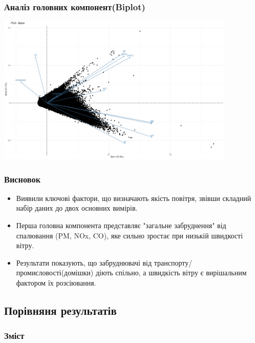 \documentclass{beamer}
\begin{document}
\begin{frame}
\frametitle{Аналіз головних компонент(Biplot)}
  \includegraphics[height=2.8in]{plots/lab4/pca/biplot.png}
\end{frame}

\begin{frame}
  \frametitle{Висновок}
  \begin{itemize}
    \item Виявили ключові фактори, що визначають якість повітря,
     звівши складний набір даних до двох основних вимірів.
    \item  Перша головна компонента представляє "загальне забруднення" від спалювання (PM, NOx, CO),
     яке сильно зростає при низькій швидкості вітру.
    \item Результати показують, що забруднювачі від транспорту/промисловості(домішки) діють спільно,
     а швидкість вітру є вирішальним фактором їх розсіювання.
  \end{itemize}
\end{frame}

\begin{frame}
  \section{Порівняня результатів}

  \frametitle{Зміст}
  \tableofcontents[currentsection]
\end{frame}
\end{document}
